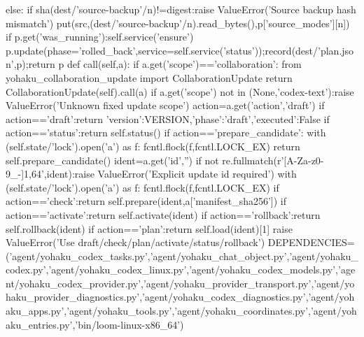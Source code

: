    else:
    if sha(dest/'source-backup'/n)!=digest:raise ValueError('Source backup hash mismatch')
    put(src,(dest/'source-backup'/n).read_bytes(),p['source_modes'][n])
  if p.get('was_running'):self.service('ensure')
  p.update(phase='rolled_back',service=self.service('status'));record(dest/'plan.json',p);return p
 def call(self,a):
  if a.get('scope')=='collaboration':
   from yohaku_collaboration_update import CollaborationUpdate
   return CollaborationUpdate(self).call(a)
  if a.get('scope') not in (None,'codex-text'):raise ValueError('Unknown fixed update scope')
  action=a.get('action','draft')
  if action=='draft':return {'version':VERSION,'phase':'draft','executed':False}
  if action=='status':return self.status()
  if action=='prepare_candidate':
   with (self.state/'lock').open('a') as f:
    fcntl.flock(f,fcntl.LOCK_EX)
    return self.prepare_candidate()
  ident=a.get('id','')
  if not re.fullmatch(r'[A-Za-z0-9_-]{1,64}',ident):raise ValueError('Explicit update id required')
  with (self.state/'lock').open('a') as f:
   fcntl.flock(f,fcntl.LOCK_EX)
   if action=='check':return self.prepare(ident,a['manifest_sha256'])
   if action=='activate':return self.activate(ident)
   if action=='rollback':return self.rollback(ident)
   if action=='plan':return self.load(ident)[1]
   raise ValueError('Use draft/check/plan/activate/status/rollback')
DEPENDENCIES=('agent/yohaku_codex_tasks.py','agent/yohaku_chat_object.py','agent/yohaku_codex.py','agent/yohaku_codex_linux.py','agent/yohaku_codex_models.py','agent/yohaku_codex_provider.py','agent/yohaku_provider_transport.py','agent/yohaku_provider_diagnostics.py','agent/yohaku_codex_diagnostics.py','agent/yohaku_apps.py','agent/yohaku_tools.py','agent/yohaku_coordinates.py','agent/yohaku_entries.py','bin/loom-linux-x86_64')

